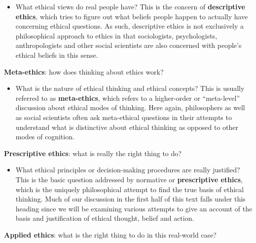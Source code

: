 \documentclass[justified]{tufte-book}
\providecommand{\tightlist}{%
  \setlength{\itemsep}{0pt}\setlength{\parskip}{0pt}}
\begin{document}
\begin{itemize}
\tightlist
\item
  What ethical views do real people have? This is the concern of \textbf{descriptive ethics}, which tries to figure out what beliefs people happen to actually have concerning ethical questions. As such, descriptive ethics is not exclusively a philosophical approach to ethics in that sociologists, psychologists, anthropologists and other social scientists are also concerned with people's ethical beliefs in this sense.
\end{itemize}

\begin{marginfigure}
\textbf{Meta-ethics}: how does thinking about ethics work?
\end{marginfigure}

\begin{itemize}
\tightlist
\item
  What is the nature of ethical thinking and ethical concepts? This is usually referred to as \textbf{meta-ethics}, which refers to a higher-order or ``meta-level'' discussion about ethical modes of thinking. Here again, philosophers as well as social scientists often ask meta-ethical questions in their attempts to understand what is distinctive about ethical thinking as opposed to other modes of cognition.
\end{itemize}

\begin{marginfigure}
\textbf{Prescriptive ethics}: what is really the right thing to do?
\end{marginfigure}

\begin{itemize}
\tightlist
\item
  What ethical principles or decision-making procedures are really justified? This is the basic question addressed by normative or \textbf{prescriptive ethics}, which is the uniquely philosophical attempt to find the true basis of ethical thinking. Much of our discussion in the first half of this text falls under this heading since we will be examining various attempts to give an account of the basis and justification of ethical thought, belief and action.
\end{itemize}

\begin{marginfigure}
\textbf{Applied ethics}: what is the right thing to do in this
real-world case?
\end{marginfigure}
\end{document}
